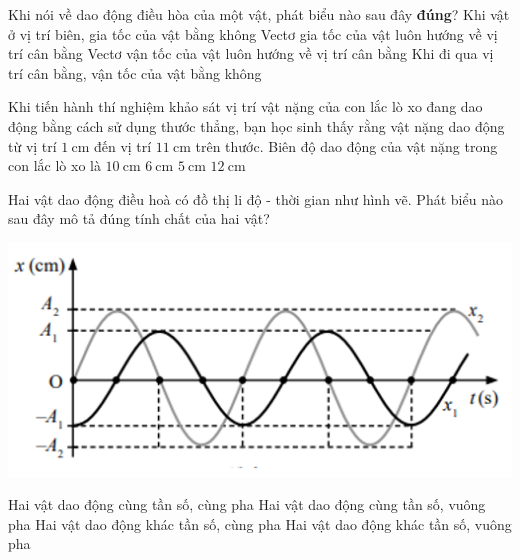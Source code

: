 \begin{ex}
	Khi nói về dao động điều hòa của một vật, phát biểu nào sau đây \textbf{đúng}?
	\choice
	{Khi vật ở vị trí biên, gia tốc của vật bằng không}
	{\True Vectơ gia tốc của vật luôn hướng về vị trí cân bằng}
	{Vectơ vận tốc của vật luôn hướng về vị trí cân bằng}
	{Khi đi qua vị trí cân bằng, vận tốc của vật bằng không}
	\loigiai{}
\end{ex}
\begin{ex}
Khi tiến hành thí nghiệm khảo sát vị trí vật nặng của con lắc lò xo đang dao động bằng cách sử dụng thước thẳng, bạn học sinh thấy rằng vật nặng dao động từ vị trí $\SI{1}{\centi\meter}$ đến vị trí $\SI{11}{\centi\meter}$ trên thước. Biên độ dao động của vật nặng trong con lắc lò xo là	
	\choice
	{$\SI{10}{\centi\meter}$}
	{$\SI{6}{\centi\meter}$}
	{\True $\SI{5}{\centi\meter}$}
	{$\SI{12}{\centi\meter}$}
\end{ex}
\begin{ex}
	Hai vật dao động điều hoà có đồ thị li độ - thời gian như hình vẽ. Phát biểu nào sau đây mô tả đúng tính chất của hai vật?
	\begin{center}
		\includegraphics[width=0.6\linewidth]{../figs/D11-2-1}
	\end{center}
	\choice
	{Hai vật dao động cùng tần số, cùng pha}
	{\True Hai vật dao động cùng tần số, vuông pha}
	{Hai vật dao động khác tần số, cùng pha}
	{Hai vật dao động khác tần số, vuông pha}
\end{ex}
